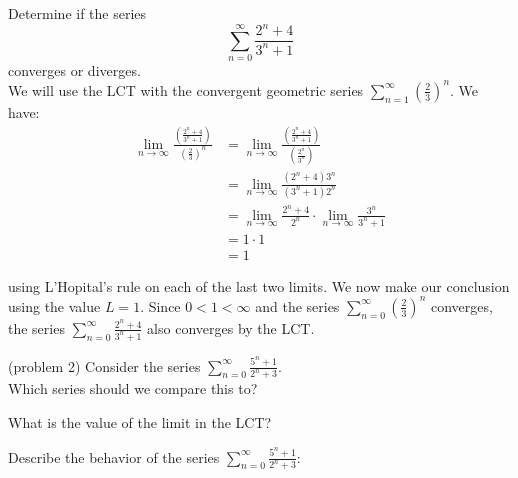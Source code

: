 \documentclass{ximera}
\begin{document}
\begin{example}[example 2]
Determine if the series 
\[
\sum_{n=0}^\infty \frac{2^n + 4}{3^n + 1}
\]
converges or diverges.\\
We will use the LCT with the convergent geometric series $\displaystyle{\sum_{n=1}^\infty \left(\frac23\right)^n}$. We have:
\begin{align*}
\lim_{n \to \infty} \frac{\left(\frac{2^n + 4}{3^n + 1}\right)}{\left(\frac23\right)^n} &= \lim_{n \to \infty} \frac{\left(\frac{2^n + 4}{3^n + 1}\right)}{\left(\frac{2^n}{3^n}\right)}\\
&=\lim_{n \to \infty} \frac{(2^n + 4)3^n}{(3^n + 1)2^n}\\
&= \lim_{n \to \infty} \frac{2^n + 4}{2^n} \cdot \lim_{n \to \infty}\frac{3^n}{3^n + 1}\\
&= 1 \cdot 1 \\
&= 1
\end{align*}

using L'Hopital's rule on each of the last two limits. We now make our conclusion using the value $L = 1$. Since $0 < 1 < \infty$ and the series $\displaystyle{\sum_{n=0}^\infty \left(\frac23\right)^n}$
converges, the series $\displaystyle{\sum_{n=0}^\infty \frac{2^n + 4}{3^n + 1}}$ also converges by the LCT.
\end{example}




\begin{problem}(problem 2)
Consider the series $\displaystyle{\sum_{n=0}^\infty \frac{5^n + 1}{2^n + 3}}$.\\
Which series should we compare this to?

\begin{multipleChoice}
\end{multipleChoice}

What is the value of the limit in the LCT?
\begin{multipleChoice}
\end{multipleChoice}

Describe the behavior of the series $\displaystyle{\sum_{n=0}^\infty \frac{5^n + 1}{2^n + 3}:}$
\begin{multipleChoice}
\end{multipleChoice}

\end{problem}
\end{document}
